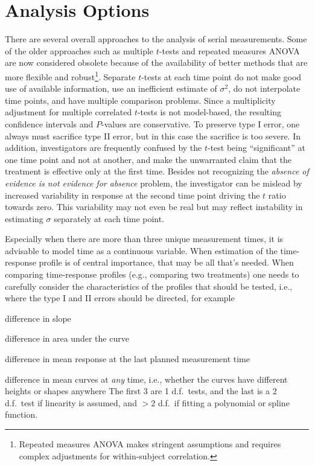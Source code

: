 \section{Analysis Options}\ipacue
There are several overall approaches to the analysis of serial
measurements.  Some of the older approaches such as multiple $t$-tests
and repeated measures ANOVA are
now considered obsolete because of the availability of better methods that are
more flexible and robust\footnote{Repeated measures ANOVA makes stringent
assumptions and requires complex adjustments for within-subject correlation.}.
Separate $t$-tests at each time point do not make good use of
available information, use an inefficient estimate of $\sigma^2$, do
not interpolate time points, and have multiple comparison problems.
Since a multiplicity adjustment for multiple correlated $t$-tests is
not model-based, the resulting confidence intervals and $P$-values
are conservative.  To preserve type I error, one always must sacrifice
type II error, but in this case the sacrifice is too severe.
In addition, investigators are frequently confused by the $t$-test being
``significant'' at one time point and not at another, and make the
unwarranted claim that the treatment is effective only at the first
time.  Besides not recognizing the \emph{absence of evidence is not
  evidence for absence} problem, the investigator can be mislead by
increased variability in response at the second time point driving
the $t$ ratio towards zero.  This variability may not even be real but
may reflect instability in estimating $\sigma$ separately at each time
point.

Especially when there are more than three unique measurement times, it is advisable to model time as a continuous variable.  When estimation of the time-response profile is of central importance, that may be all that's needed.  When comparing time-response profiles (e.g., comparing two treatments) one needs to carefully consider the characteristics of the profiles that should be tested, i.e., where the type I and II errors should be directed, for example
\bi
\item difference in slope
\item difference in area under the curve
\item difference in mean response at the last planned measurement time
\item difference in mean curves at \emph{any} time, i.e., whether the curves have different heights or shapes anywhere
\ei
The first 3 are 1 d.f.\ tests, and the last is a 2 d.f.\ test if linearity is assumed, and $> 2$ d.f.\ if fitting a polynomial or spline function.


